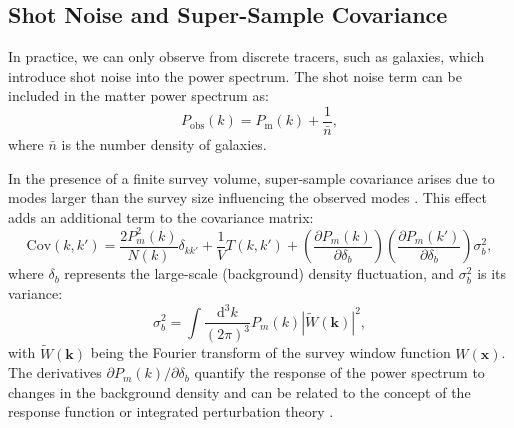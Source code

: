 \subsection{Shot Noise and Super-Sample Covariance}
In practice, we can only observe from discrete tracers, such as galaxies, which introduce shot noise into the power spectrum. The shot noise term can be included in the matter power spectrum as:
\begin{equation}
    P_{\text{obs}}(k) = P_{\mathrm{m}}(k) + \frac{1}{\bar{n}},
\end{equation}
where \( \bar{n} \) is the number density of galaxies.

In the presence of a finite survey volume, super-sample covariance arises due to modes larger than the survey size influencing the observed modes \citep{PhysRevD.87.123504}. This effect adds an additional term to the covariance matrix:
\begin{equation}
    \mathrm{Cov}(k, k') = \frac{2 P_m^2(k)}{N(k)} \delta_{kk'} + \frac{1}{V} T(k, k') + \left( \frac{\partial P_m(k)}{\partial \delta_b} \right) \left( \frac{\partial P_m(k')}{\partial \delta_b} \right) \sigma_b^2,
\end{equation}
where \( \delta_b \) represents the large-scale (background) density fluctuation, and \( \sigma_b^2 \) is its variance:
\begin{equation}
    \sigma_b^2 = \int \frac{\mathrm{d}^3 k}{(2\pi)^3} P_m(k) |\tilde{W}(\mathbf{k})|^2,
\end{equation}
with \( \tilde{W}(\mathbf{k}) \) being the Fourier transform of the survey window function \( W(\mathbf{x}) \).
The derivatives \( \partial P_m(k) / \partial \delta_b \) quantify the response of the power spectrum to changes in the background density and can be related to the concept of the response function or integrated perturbation theory \citep{2014PhRvD..89h3519L}.

